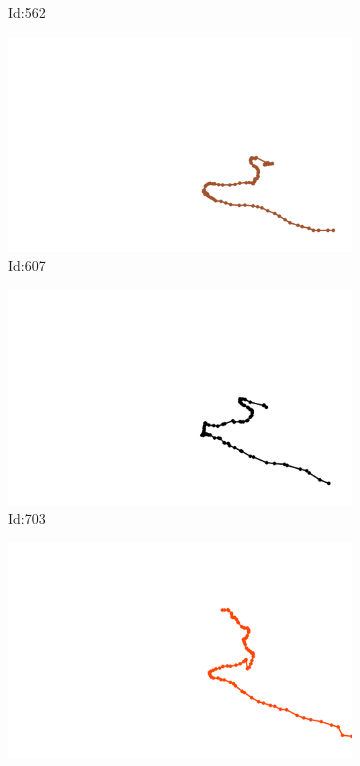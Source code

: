 \documentclass[12pt,twoside]{report}
\begin{document}
\begin{figure}
\begin{subfigure}[b]{0.20\textwidth}
\caption{Id:562}
\end{subfigure}
\begin{subfigure}[b]{0.20\textwidth}
\centering
\includegraphics[width=\textwidth]{../../trajectories/607.png}
\caption{Id:607}
\end{subfigure}
\begin{subfigure}[b]{0.20\textwidth}
\centering
\includegraphics[width=\textwidth]{../../trajectories/703.png}
\caption{Id:703}
\end{subfigure}
\begin{subfigure}[b]{0.20\textwidth}
\centering
\includegraphics[width=\textwidth]{../../trajectories/744.png}

\end{subfigure}
\end{figure}
\end{document}
